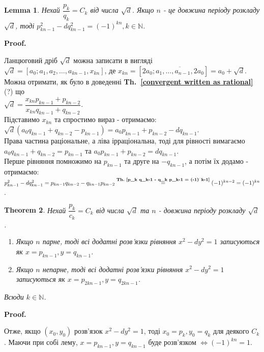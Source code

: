 \documentclass[a4paper, 14pt]{extarticle}
\makeatletter
\theoremstyle{theoremdd}
\newtheorem{theorem}{Theorem}[subsection]
\theoremstyle{theoremdd}
\theoremstyle{theoremdd}
\theoremstyle{theoremdd}
\theoremstyle{theoremdd}
\theoremstyle{theoremdd}
\theoremstyle{theoremdd}
\newtheorem{lemma}[theorem]{Lemma}
\theoremstyle{theoremdd}
\def\qed{$\blacksquare$}
\renewenvironment{proof}[1][Proof.\\]{\par
\pushQED{\hfill \qed}%
\normalfont \topsep6\p@\@plus6\p@\relax
\trivlist
\item\relax
{\bfseries
#1\@addpunct{.}}\hspace\labelsep\ignorespaces
}{%
\popQED\endtrivlist\@endpefalse
}
\newcommand\thref[1]{\textbf{Th.~\ref{#1}}}
\makeatother
\begin{document}
\begin{lemma}
Нехай $\dfrac{p_k}{q_k} = C_k$ від числа $\sqrt{d}$. Якщо $n$ - це довжина періоду розкладу $\sqrt{d}$, тоді $p^2_{kn-1} - dq^2_{kn-1} = (-1)^{kn}, k \in \mathbb{N}$.
\end{lemma}

\begin{proof}
Ланцюговий дріб $\sqrt{d}$ можна записати в вигляді \\ $\sqrt{d} = [a_0; a_1,a_2,\dots, a_{kn-1}, x_{kn}]$, де $x_{kn} = [2a_0; \overline{a_1,\dots,a_{n-1}, 2a_0}] = a_0 + \sqrt{d}$. Можна отримати, як було в доведенні \thref{convergent written as rational} (?) що \\
$\sqrt{d} = \dfrac{x_{kn} p_{kn-1} + p_{kn-2}}{x_{kn} q_{kn-1} + q_{kn-2}}$.\\
Підставимо $x_{kn}$ та спростимо вираз - отримаємо:\\
$\sqrt{d} (a_0 q_{kn-1} + q_{kn-2} - p_{kn-1}) = a_0 p_{kn-1} + p_{kn-2} - dq_{kn-1}$.\\
Права частина раціональне, а ліва ірраціональна, тоді для рівності вимагаємо $a_0 q_{kn-1} + q_{kn-2} = p_{kn-1}$ та $a_0 p_{kn-1} + p_{kn-2} = dq_{kn-1}$.\\
Перше рівняння помножимо на $p_{kn-1}$ та друге на $-q_{kn-1}$, а потім їх додамо - отримаємо:\\
$p^2_{kn-1} - dq^2_{kn-1} = p_{kn-1}q_{kn-2} - q_{kn-1}p_{kn-2} \overset{\thref{p_k q_k-1 - q_k p_k-1 = (-1)^k-1}}{=} (-1)^{kn-2} = (-1)^{kn}$.
\end{proof}

\begin{theorem}
Нехай $\dfrac{p_k}{c_k} = C_k$ від числа $\sqrt{d}$ та $n$ - довжина періоду розкладу $\sqrt{d}$.
\begin{enumerate}
\item Якщо $n$ парне, тоді всі додатні розв'язки рівняння $x^2-dy^2 = 1$ записуються як $x = p_{kn-1}, y = q_{kn-1}$.

\item Якщо $n$ непарне, тоді всі додатні розв'язки рівняння $x^2-dy^2 = 1$ записуються як $x = p_{2kn-1}, y = q_{2kn-1}$.
\end{enumerate}
Всюди $k \in \mathbb{N}$.
\end{theorem}

\begin{proof}
Отже, якщо $(x_0,y_0)$ розв'язок $x^2 - dy^2 = 1$, тоді $x_0 = p_k, y_0 = q_k$ для деякого $C_k$. Маючи при собі лему, $x = p_{kn-1}, y = q_{kn-1}$ буде розв'язком $\iff (-1)^{kn} = 1$.
\end{proof}
\end{document}
